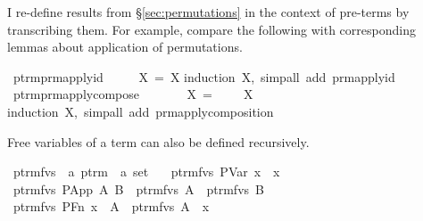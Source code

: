 I re-define results from \S\ref{sec:permutations} in the context of pre-terms by transcribing them.
For example, compare the following with corresponding lemmas about application of permutations.

\begin{implementation}
\isamarkupfalse%
\ ptrm{\isacharunderscore}prm{\isacharunderscore}apply{\isacharunderscore}id{\isacharcolon}\isanewline
\ \ \ {\isachardoublequoteopen}{\isasymepsilon}\ {\isasymbullet}\ X\ =\ X{\isachardoublequoteclose}\isanewline
\isatagproof
{}\isamarkupfalse%
{\isacharparenleft}induction\ X,\ simp{\isacharunderscore}all\ add{\isacharcolon}\ prm{\isacharunderscore}apply{\isacharunderscore}id{\isacharparenright}%
\endisatagproof
\isanewline
\isanewline
{}\isamarkupfalse%
\ ptrm{\isacharunderscore}prm{\isacharunderscore}apply{\isacharunderscore}compose{\isacharcolon}\isanewline
\ \ \ {\isachardoublequoteopen}{\isasympi}\ {\isasymbullet}\ {\isasymsigma}\ {\isasymbullet}\ X\ =\ {\isacharparenleft}{\isasympi}\ {\isasymdiamondop}\ {\isasymsigma}{\isacharparenright}\ {\isasymbullet}\ X{\isachardoublequoteclose}\isanewline
\isatagproof
{}\isamarkupfalse%
{\isacharparenleft}induction\ X,\ simp{\isacharunderscore}all\ add{\isacharcolon}\ prm{\isacharunderscore}apply{\isacharunderscore}composition{\isacharparenright}%
\endisatagproof
\end{implementation}

Free variables of a term can also be defined recursively.

\begin{implementation}
\isamarkupfalse%
\ ptrm{\isacharunderscore}fvs\ {\isacharcolon}{\isacharcolon}\ {\isachardoublequoteopen}{\isacharprime}a\ ptrm\ {\isasymRightarrow}\ {\isacharprime}a\ set{\isachardoublequoteclose}\ \isanewline
\ \ {\isachardoublequoteopen}ptrm{\isacharunderscore}fvs\ {\isacharparenleft}PVar\ x{\isacharparenright}\ {\isacharequal}\ {\isacharbraceleft}x{\isacharbraceright}{\isachardoublequoteclose}\isanewline
{\isacharbar}\ {\isachardoublequoteopen}ptrm{\isacharunderscore}fvs\ {\isacharparenleft}PApp\ A\ B{\isacharparenright}\ {\isacharequal}\ ptrm{\isacharunderscore}fvs\ A\ {\isasymunion}\ ptrm{\isacharunderscore}fvs\ B{\isachardoublequoteclose}\isanewline
{\isacharbar}\ {\isachardoublequoteopen}ptrm{\isacharunderscore}fvs\ {\isacharparenleft}PFn\ x\ {\isacharunderscore}\ A{\isacharparenright}\ {\isacharequal}\ ptrm{\isacharunderscore}fvs\ A\ {\isacharminus}\ {\isacharbraceleft}x{\isacharbraceright}{\isachardoublequoteclose}
\end{implementation}

